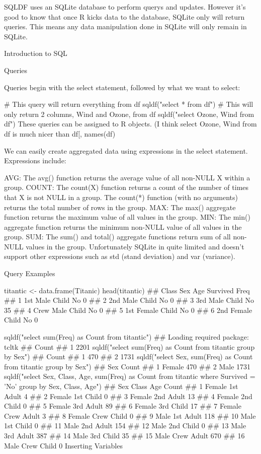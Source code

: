 SQLDF uses an SQLite database to perform querys and updates. However it’s good to know that once R kicks data to the database, SQLite only will return queries. This means any data manipulation done in SQLite will only remain in SQLite.

Introduction to SQL

Queries

Queries begin with the select statement, followed by what we want to select:

# This query will return everything from df
sqldf("select * from df")
# This will only return 2 columns, Wind and Ozone, from df
sqldf("select Ozone, Wind from df")
These queries can be assigned to R objects. (I think select Ozone, Wind from df is much nicer than df[, names(df) %

We can easily create aggregated data using expressions in the select statement. Expressions include:

AVG: The avg() function returns the average value of all non-NULL X within a group.
COUNT: The count(X) function returns a count of the number of times that X is not NULL in a group. The count(*) function (with no arguments) returns the total number of rows in the group.
MAX: The max() aggregate function returns the maximum value of all values in the group.
MIN: The min() aggregate function returns the minimum non-NULL value of all values in the group.
SUM: The sum() and total() aggregate functions return sum of all non-NULL values in the group.
Unfortunately SQLite in quite limited and doesn’t support other expressions such as std (stand deviation) and var (variance).

Query Examples

titantic <- data.frame(Titanic)
head(titantic)
##   Class    Sex   Age Survived Freq
## 1   1st   Male Child       No    0
## 2   2nd   Male Child       No    0
## 3   3rd   Male Child       No   35
## 4  Crew   Male Child       No    0
## 5   1st Female Child       No    0
## 6   2nd Female Child       No    0

sqldf("select sum(Freq) as Count from titantic")
## Loading required package: tcltk
##   Count
## 1  2201
sqldf("select sum(Freq) as Count from titantic group by Sex")
##   Count
## 1   470
## 2  1731
sqldf("select Sex, sum(Freq) as Count from titantic group by Sex")
##      Sex Count
## 1 Female   470
## 2   Male  1731
sqldf("select Sex, Class, Age, sum(Freq) as Count from titantic where Survived = 'No' group by Sex, Class, Age")
##       Sex Class   Age Count
## 1  Female   1st Adult     4
## 2  Female   1st Child     0
## 3  Female   2nd Adult    13
## 4  Female   2nd Child     0
## 5  Female   3rd Adult    89
## 6  Female   3rd Child    17
## 7  Female  Crew Adult     3
## 8  Female  Crew Child     0
## 9    Male   1st Adult   118
## 10   Male   1st Child     0
## 11   Male   2nd Adult   154
## 12   Male   2nd Child     0
## 13   Male   3rd Adult   387
## 14   Male   3rd Child    35
## 15   Male  Crew Adult   670
## 16   Male  Crew Child     0
Inserting Variables

